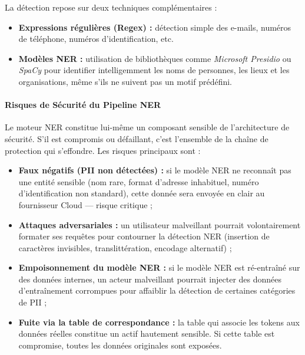 \documentclass[12pt, a4paper]{report}
\begin{document}
La détection repose sur deux techniques complémentaires :

\begin{itemize}
  \item \textbf{Expressions régulières (Regex) :} détection simple des
        e-mails, numéros de téléphone, numéros d'identification, etc.
  \item \textbf{Modèles NER :} utilisation de bibliothèques comme
        \textit{Microsoft Presidio} ou \textit{SpaCy} pour identifier
        intelligemment les noms de personnes, les lieux et les
        organisations, même s'ils ne suivent pas un motif prédéfini.
\end{itemize}

\paragraph{Risques de Sécurité du Pipeline NER}

Le moteur NER constitue lui-même un composant sensible de l'architecture
de sécurité. S'il est compromis ou défaillant, c'est l'ensemble de la
chaîne de protection qui s'effondre. Les risques principaux sont :

\begin{itemize}
  \item \textbf{Faux négatifs (PII non détectées) :} si le modèle NER
        ne reconnaît pas une entité sensible (nom rare, format d'adresse
        inhabituel, numéro d'identification non standard), cette donnée
        sera envoyée en clair au fournisseur Cloud --- risque critique ;
  \item \textbf{Attaques adversariales :} un utilisateur malveillant
        pourrait volontairement formater ses requêtes pour contourner la
        détection NER (insertion de caractères invisibles,
        translittération, encodage alternatif) ;
  \item \textbf{Empoisonnement du modèle NER :} si le modèle NER est
        ré-entraîné sur des données internes, un acteur malveillant
        pourrait injecter des données d'entraînement corrompues pour
        affaiblir la détection de certaines catégories de PII ;
  \item \textbf{Fuite via la table de correspondance :} la table qui
        associe les tokens aux données réelles constitue un actif
        hautement sensible. Si cette table est compromise, toutes les
        données originales sont exposées.
\end{itemize}
\end{document}
